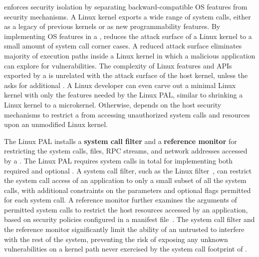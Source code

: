 \graphene{} enforces security isolation %
by separating 
backward-compatible OS features from security mechanisms.
A Linux kernel exports a wide range of system calls,
either as a legacy of previous kernels or as new programmability features. %
By implementing OS features in a \libos{},
\graphene{} reduces the attack surface of a Linux kernel
to a small amount of system call corner cases.
A reduced attack surface
eliminates majority of execution paths inside a Linux kernel in which a malicious application can explore for vulnerabilities.
The complexity of Linux features and APIs exported by a \libos{} is unrelated with the attack surface of the host kernel,
unless the \libos{} asks for additional \hostapis{}.
A Linux developer can even carve out a minimal Linux kernel with only the features needed by the Linux PAL,
similar to shrinking a Linux kernel to a microkernel.
Otherwise, \graphene{} depends on the host security mechanisms to restrict a \libos{} from accessing unauthorized system calls and resources upon an unmodified Linux kernel.





The Linux PAL installs a {\bf system call filter} and a {\bf reference monitor}
for restricting the system calls, files, RPC streams, and network addresses
accessed by a \picoproc{}.
The Linux PAL requires \hostsyscallnum{} system calls in total
for implementing both required and optional \hostapis{}.
A system call filter, such as the Linux \seccomp{} filter~\cite{seccomp},
can restrict the system call access of an application
to only a small subset of all the system calls, with additional constraints on the parameters and optional flags permitted for each system call.
A reference monitor further examines the arguments of permitted system calls to restrict the host resources accessed by an application, based on security policies configured in a manifest file~\cite{hunt07rethink}.
The system call filter and the reference monitor
significantly limit the ability of an untrusted \graphene{} \picoproc{} to interfere with the rest of the system,
preventing the risk of exposing any unknown vulnerabilities
on a kernel path never exercised by the system call footprint of \graphene{}.



